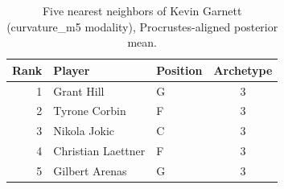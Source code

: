 \begin{table}[htbp]
  \centering\small
  \begin{tabular}{rllc}
    \toprule
    Rank & Player & Position & Archetype \\
    \midrule
    1 & Grant Hill & G & 3 \\
    2 & Tyrone Corbin & F & 3 \\
    3 & Nikola Jokic & C & 3 \\
    4 & Christian Laettner & F & 3 \\
    5 & Gilbert Arenas & G & 3 \\
    \bottomrule
  \end{tabular}
  \caption{Five nearest neighbors of Kevin Garnett (curvature_m5 modality), Procrustes-aligned posterior mean.}
  \label{tab:Kevin_Garnett_neighbors_curvature_m5}
\end{table}

